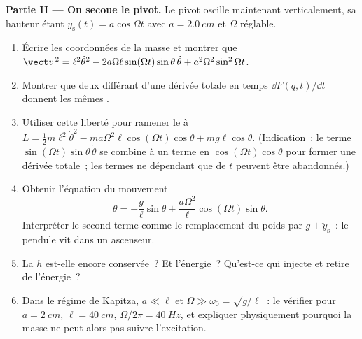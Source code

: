 \begin{problem}
\medskip\noindent\textbf{Partie II --- On secoue le pivot.}
Le pivot oscille maintenant verticalement, sa hauteur étant $y_{\text{s}}(t) =
a\cos\Omega t$ avec $a = \qty{2.0}{cm}$ et $\Omega$ réglable.
\begin{enumerate}[resume]
  \item Écrire les coordonnées de la masse et montrer que
        $\vect v^{\,2} = \ell^2\dot\theta^2 -
        2a\Omega\ell\sin(\Omega t)\sin\theta\,\dot\theta +
        a^2\Omega^2\sin^2\Omega t$.
  \item Montrer que deux  différant d'une dérivée totale en
        temps $\dd F(q,t)/\dd t$ donnent les mêmes .
  \item Utiliser cette liberté pour ramener le  à $L = \tfrac12 m
        \ell^2\dot\theta^2 - ma\Omega^2\ell\cos(\Omega t)\cos\theta +
        mg\ell\cos\theta$. (Indication~: le terme
        $\sin(\Omega t)\sin\theta\,\dot\theta$ se combine à un terme en
        $\cos(\Omega t)\cos\theta$ pour former une dérivée totale~; les
        termes ne dépendant que de $t$ peuvent être abandonnés.)
  \item Obtenir l'équation du mouvement
        \[
        \ddot\theta = -\frac{g}{\ell}\sin\theta
         + \frac{a\Omega^2}{\ell}\cos(\Omega t)\sin\theta .
        \]
        Interpréter le second terme comme le remplacement du poids par $g +
        \ddot y_{\text{s}}$~: le pendule vit dans un ascenseur.
  \item La  $h$ est-elle encore conservée~? Et
        l'énergie~? Qu'est-ce qui injecte et retire de l'énergie~?
  \item Dans le régime de Kapitza, $a \ll \ell$ et $\Omega \gg \omega_0 =
        \sqrt{g/\ell}$~: le vérifier pour $a = \qty{2}{cm}$, $\ell =
        \qty{40}{cm}$, $\Omega/2\pi = \qty{40}{Hz}$, et expliquer
        physiquement pourquoi la masse ne peut alors pas suivre
        l'excitation.
\end{enumerate}


\end{problem}
